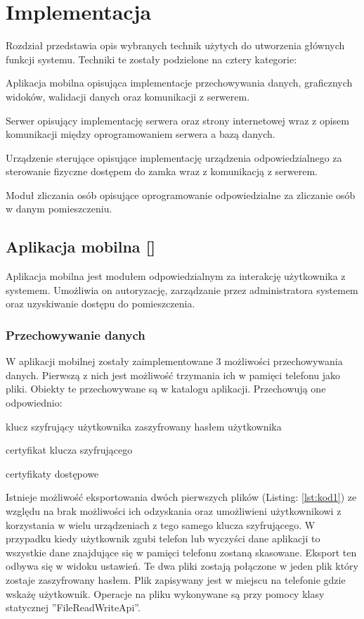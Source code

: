 \newpage\section{Implementacja} \label{sec:implementacja}
Rozdział przedstawia opis wybranych technik użytych do utworzenia głównych funkcji systemu. Techniki te zostały podzielone na cztery kategorie:
\begin{itemize*}
	\item Aplikacja mobilna opisująca implementacje przechowywania danych, graficznych widoków, walidacji danych oraz komunikacji z serwerem. 
	\item Serwer opisujący implementację serwera  oraz strony internetowej wraz z opisem komunikacji między oprogramowaniem serwera a bazą danych.
	\item  Urządzenie sterujące opisujące implementację urządzenia odpowiedzialnego za sterowanie fizyczne dostępem do zamka wraz z komunikacją z serwerem.
	\item Moduł zliczania osób opisujące oprogramowanie odpowiedzialne za zliczanie osób w danym pomieszczeniu. 
\end{itemize*} 
\subsection[Aplikacja mobilna]{Aplikacja mobilna [\StudentB]}
 Aplikacja mobilna jest  modułem odpowiedzialnym za interakcję użytkownika z systemem. Umożliwia on autoryzację, zarządzanie przez administratora systemem oraz uzyskiwanie dostępu do pomieszczenia.
	\subsubsection{Przechowywanie danych}
	W aplikacji mobilnej zostały zaimplementowane 3 możliwości przechowywania danych. Pierwszą z nich jest możliwość trzymania ich w pamięci telefonu jako pliki. Obiekty te przechowywane są w katalogu aplikacji. Przechowują one odpowiednio:
	\begin{itemize*}
	\item	klucz szyfrujący użytkownika zaszyfrowany hasłem użytkownika
	\item certyfikat klucza szyfrującego 
	\item certyfikaty dostępowe
	\end{itemize*}	
	Istnieje możliwość eksportowania dwóch pierwszych plików (Listing: \ref{lst:kod1}) ze względu na brak możliwości ich odzyskania oraz umożliwieni użytkownikowi z korzystania w wielu urządzeniach z tego samego klucza szyfrującego. W przypadku kiedy użytkownik zgubi telefon lub  wyczyści dane aplikacji to wszystkie dane znajdujące się w pamięci telefonu zostaną skasowane. Eksport ten odbywa się w widoku ustawień. Te dwa pliki zostają połączone w jeden plik który zostaje zaszyfrowany hasłem. Plik zapisywany jest w miejscu na telefonie gdzie wskażę użytkownik.  Operacje na pliku wykonywane są przy pomocy klasy statycznej ''FileReadWriteApi''.
	
